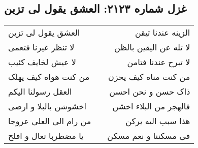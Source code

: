 \begin{center}
\section*{غزل شماره ۲۱۲۳: العشق یقول لی تزین}
\label{sec:2123}
\begin{longtable}{l p{0.5cm} r}
العشق یقول لی تزین
&&
الزینه عندنا تیقن
\\
لا تنظر غیرنا فتعمی
&&
لا تله عن الیقین بالظن
\\
لا عیش لخایف کئیب
&&
لا تبرح عندنا فتامن
\\
من کنت هواه کیف یهلک
&&
من کنت مناه کیف یحزن
\\
العقل رسولنا الیکم
&&
ذاک حسن و نحن احسن
\\
اخشوشن بالبلا و ارضی
&&
فالهجر من البلاء اخشن
\\
من رام الی العلی عروجا
&&
هذا سبب الیه یرکن
\\
یا مضطربا تعال و افلح
&&
فی مسکننا و نعم مسکن
\\
\end{longtable}
\end{center}
